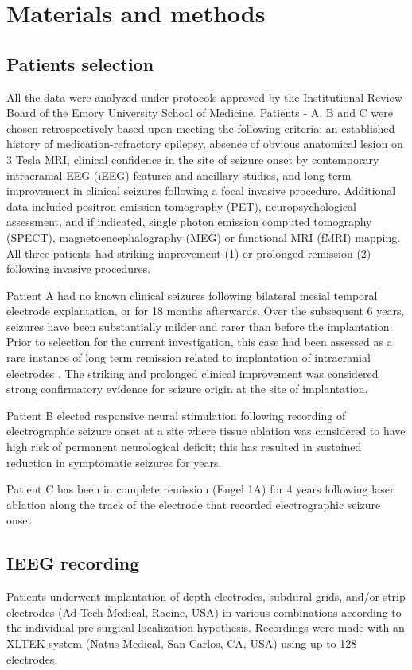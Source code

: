 \section{Materials and methods}
\label{sec:methods}

\subsection{Patients selection}
All the data were analyzed under protocols approved by the Institutional Review Board of the Emory University School of Medicine. Patients - A, B and C were chosen retrospectively based upon meeting the following criteria: an established history of medication-refractory epilepsy, absence of obvious anatomical lesion on 3 Tesla MRI, clinical confidence in the site of seizure onset by contemporary intracranial EEG (iEEG) features and ancillary studies, and long-term improvement in clinical seizures following a focal invasive procedure. Additional data included positron emission tomography (PET), neuropsychological assessment, and if indicated, single photon emission computed tomography (SPECT), magnetoencephalography (MEG) or functional MRI (fMRI) mapping. All three patients had striking improvement (1) or prolonged remission (2) following invasive procedures.

Patient A had no known clinical seizures following bilateral mesial temporal electrode explantation, or for 18 months afterwards. Over the subsequent 6 years, seizures have been substantially milder and rarer than before the implantation. Prior to selection for the current investigation, this case had been assessed as a rare instance of long term remission related to implantation of intracranial electrodes \citep{katariwala2001remission, schulze2010seizure} . The striking and prolonged clinical improvement was considered strong confirmatory evidence for seizure origin at the site of implantation.%

Patient B elected responsive neural stimulation following recording of electrographic seizure onset at a site where tissue ablation was considered to have high risk of permanent neurological deficit; this has resulted in sustained reduction in symptomatic seizures for  years.

Patient C  has been in complete remission (Engel 1A)
for 4 years following laser ablation along the track of the electrode that recorded electrographic seizure onset 


\subsection{IEEG recording}
Patients underwent implantation of depth electrodes, subdural grids, and/or strip electrodes (Ad-Tech Medical, Racine, USA) in various combinations according to the individual pre-surgical localization hypothesis.  Recordings were made with an XLTEK system (Natus Medical, San Carlos, CA, USA) using up to 128 electrodes. 

